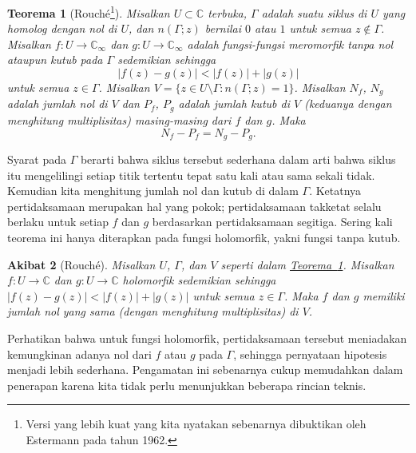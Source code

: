 \documentclass[12pt,openany]{book}
\newcommand{\sabs}[1]{\lvert {#1} \rvert}
\newcommand{\C}{{\mathbb{C}}}
\theoremstyle{plain}
\newtheorem{thm}{Teorema}[section]
\newtheorem{cor}[thm]{Akibat}
\theoremstyle{remark}
\theoremstyle{definition}
\theoremstyle{exercise}
\theoremstyle{example}
\newcommand{\thmref}[1]{\hyperref[#1]{Teorema~\ref*{#1}}}
\begin{document}
\begin{thm}[Rouch\'e\footnote{%
Versi yang lebih kuat yang kita nyatakan sebenarnya dibuktikan oleh Estermann pada tahun 1962.}]\label{thm:rouche}
\pagebreak[2]
Misalkan $U \subset \C$ terbuka, $\Gamma$ adalah suatu siklus
di $U$ yang homolog dengan nol di $U$,
dan $n(\Gamma;z)$ bernilai $0$ atau $1$ untuk semua $z \notin \Gamma$.
Misalkan $f \colon U \to \C_\infty$ dan $g \colon U \to \C_\infty$
adalah fungsi-fungsi meromorfik tanpa nol ataupun kutub pada
$\Gamma$ sedemikian sehingga
\begin{equation*}
\sabs{f(z)-g(z)} < \sabs{f(z)}+\sabs{g(z)}
\end{equation*}
untuk semua $z \in \Gamma$.
Misalkan $V = \bigl\{ z \in U \setminus \Gamma : n(\Gamma;z) = 1 \bigr\}$.
Misalkan $N_f$, $N_g$ adalah jumlah nol di $V$
dan $P_f$, $P_g$ adalah jumlah kutub di $V$ (keduanya dengan menghitung multiplisitas)
masing-masing dari $f$ dan $g$.
Maka
\begin{equation*}
N_f - P_f = 
N_g - P_g.
\end{equation*}
\end{thm}

Syarat pada $\Gamma$ berarti bahwa
siklus tersebut sederhana dalam arti
bahwa siklus itu mengelilingi setiap titik tertentu tepat satu kali atau sama sekali tidak.
Kemudian kita menghitung jumlah nol dan kutub di dalam $\Gamma$.
Ketatnya pertidaksamaan merupakan hal yang pokok;
pertidaksamaan takketat selalu berlaku untuk setiap $f$ dan $g$ berdasarkan pertidaksamaan
segitiga.
Sering kali teorema ini hanya diterapkan pada fungsi holomorfik, yakni
fungsi tanpa kutub.

\begin{cor}[Rouch\'e]\label{thm:rouche2}
Misalkan $U$, $\Gamma$, dan $V$ seperti dalam \thmref{thm:rouche}.
Misalkan $f \colon U \to \C$ dan $g \colon U \to \C$
holomorfik sedemikian sehingga
$\sabs{f(z)-g(z)} < \sabs{f(z)}+\sabs{g(z)}$
untuk semua $z \in \Gamma$.  Maka $f$ dan $g$ memiliki jumlah nol yang sama
(dengan menghitung multiplisitas) di $V$.
\end{cor}

Perhatikan bahwa untuk fungsi holomorfik,
pertidaksamaan tersebut meniadakan kemungkinan adanya nol dari $f$ atau
$g$ pada $\Gamma$, sehingga pernyataan hipotesis menjadi lebih sederhana.
Pengamatan ini sebenarnya cukup memudahkan dalam
penerapan karena kita tidak perlu menunjukkan beberapa rincian teknis.
\end{document}
